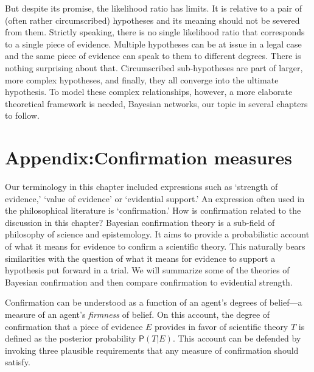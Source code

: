 \documentclass[
  10pt,
  dvipsnames,enabledeprecatedfontcommands]{scrartcl}
\newcommand{\pr}[1]{\mathsf{P}(#1)}
\begin{document}
But despite its promise, the likelihood ratio has limits. It is relative
to a pair of (often rather circumscribed) hypotheses and its meaning
should not be severed from them. Strictly speaking, there is no single
likelihood ratio that corresponds to a single piece of evidence.
Multiple hypotheses can be at issue in a legal case and the same piece
of evidence can speak to them to different degrees. There is nothing
surprising about that. Circumscribed sub-hypotheses are part of larger,
more complex hypotheses, and finally, they all converge into the
ultimate hypothesis. To model these complex relationships, however, a
more elaborate theoretical framework is needed, Bayesian networks, our
topic in several chapters to follow.

\appendix


\hypertarget{appendixconfirmation-measures}{%
\section{\texorpdfstring{Appendix:Confirmation measures
\label{sec:confirmation}}{Appendix:Confirmation measures }}\label{appendixconfirmation-measures}}

Our terminology in this chapter included expressions such as `strength
of evidence,' `value of evidence' or `evidential support.' An expression
often used in the philosophical literature is `confirmation.' How is
confirmation related to the discussion in this chapter? Bayesian
confirmation theory is a sub-field of philosophy of science and
epistemology. It aims to provide a probabilistic account of what it
means for evidence to confirm a scientific theory. This naturally bears
similarities with the question of what it means for evidence to support
a hypothesis put forward in a trial. We will summarize some of the
theories of Bayesian confirmation and then compare confirmation to
evidential strength.

Confirmation can be understood as a function of an agent's degrees of
belief---a measure of an agent's \textit{firmness} of belief. On this
account, the degree of confirmation that a piece of evidence \(E\)
provides in favor of scientific theory \(T\) is defined as the posterior
probability \(\pr{T \vert E}\). This account can be defended by invoking
three plausible requirements that any measure of confirmation should
satisfy.
\end{document}
